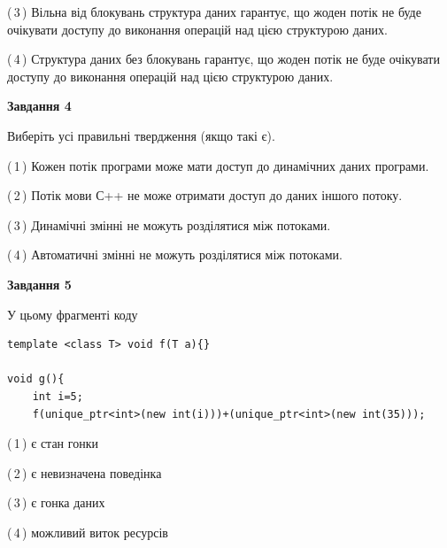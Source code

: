 \documentclass[12pt, ukrainian]{article}
\begin{document}
\begin {large}
{(\,3\,) Вільна від блокувань структура даних гарантує, що жоден потік не буде очікувати доступу до виконання операцій над цією структурою даних.%

(\,4\,) Структура даних без блокувань гарантує, що жоден потік не буде очікувати доступу до виконання операцій над цією структурою даних.%



\begin{center}
\textbf{Завдання 4}
\end{center}
Виберіть усі правильні твердження (якщо такі є).\par
\vspace{2mm}

(\,1\,) Кожен потік програми може мати доступ до динамічних даних програми.%

(\,2\,) Потік мови С++ не може отримати доступ до даних іншого потоку.%

(\,3\,) Динамічні змінні не можуть розділятися між потоками.%

(\,4\,) Автоматичні змінні не можуть розділятися між потоками.%



\begin{center}
\textbf{Завдання 5}
\end{center}
У цьому фрагменті коду
\begin{verbatim}
template <class T> void f(T a){}

void g(){
    int i=5;
    f(unique_ptr<int>(new int(i)))+(unique_ptr<int>(new int(35)));
\end{verbatim}
(\,1\,) є стан гонки%

(\,2\,) є невизначена поведінка%

(\,3\,) є гонка даних%

(\,4\,) можливий виток ресурсів%


}
\end {large}
\end{document}
